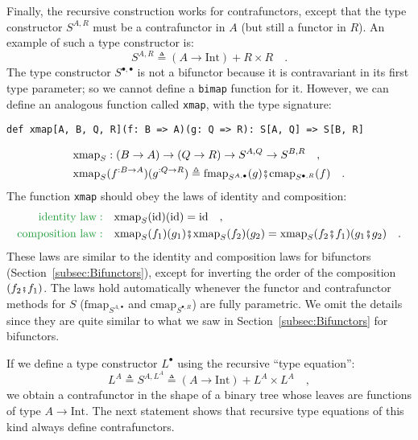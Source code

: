 Finally, the recursive construction works for contrafunctors, except
that the type constructor $S^{A,R}$ must be a contrafunctor in $A$
(but still a functor in $R$). An example of such a type constructor
is:
\begin{equation}
S^{A,R}\triangleq\left(A\rightarrow\text{Int}\right)+R\times R\quad.\label{eq:f-example-contra-bifunctor}
\end{equation}
The type constructor $S^{\bullet,\bullet}$ is not a bifunctor because
it is contravariant in its first type parameter; so we cannot define
a \lstinline!bimap! function for it. However, we can define an analogous
function called \lstinline!xmap!, with the type signature:
\begin{lstlisting}
def xmap[A, B, Q, R](f: B => A)(g: Q => R): S[A, Q] => S[B, R]
\end{lstlisting}
\begin{align*}
 & \text{xmap}_{S}:\left(B\rightarrow A\right)\rightarrow\left(Q\rightarrow R\right)\rightarrow S^{A,Q}\rightarrow S^{B,R}\quad,\\
 & \text{xmap}_{S}(f^{:B\rightarrow A})(g^{:Q\rightarrow R})\triangleq\text{fmap}_{S^{A,\bullet}}(g)\bef\text{cmap}_{S^{\bullet,R}}(f)\quad.
\end{align*}
The function \lstinline!xmap! should obey the laws of identity and
composition:
\begin{align}
{\color{greenunder}\text{identity law}:}\quad & \text{xmap}_{S}(\text{id})(\text{id})=\text{id}\quad,\label{eq:f-profunctor-identity-law}\\
{\color{greenunder}\text{composition law}:}\quad & \text{xmap}_{S}(f_{1})(g_{1})\bef\text{xmap}_{S}(f_{2})(g_{2})=\text{xmap}_{S}(f_{2}\bef f_{1})(g_{1}\bef g_{2})\quad.\label{eq:f-profunctor-composition-law}
\end{align}
These laws are similar to the identity and composition laws for bifunctors
(Section~\ref{subsec:Bifunctors}), except for inverting the order
of the composition $\left(f_{2}\bef f_{1}\right)$. The laws hold
automatically whenever the functor and contrafunctor methods for $S$
($\text{fmap}_{S^{A,\bullet}}$ and $\text{cmap}_{S^{\bullet,R}}$)
are fully parametric. We omit the details since they are quite similar
to what we saw in Section~\ref{subsec:Bifunctors} for bifunctors.

If we define a type constructor $L^{\bullet}$ using the recursive
\textsf{``}type equation\textsf{''}:
\[
L^{A}\triangleq S^{A,L^{A}}\triangleq\left(A\rightarrow\text{Int}\right)+L^{A}\times L^{A}\quad,
\]
we obtain a contrafunctor in the shape of a binary tree whose leaves
are functions of type $A\rightarrow\text{Int}$. The next statement
shows that recursive type equations of this kind always define contrafunctors.

